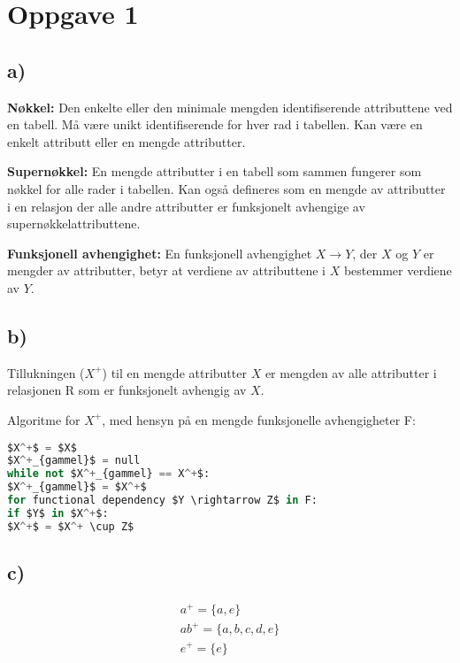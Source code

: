 \documentclass[a4paper, 12pt] {article}
\begin{document}

\newpage

\tableofcontents
\newpage


\section{Oppgave 1}

\subsection{a)}

\textbf{Nøkkel:} Den enkelte eller den minimale mengden identifiserende attributtene ved en tabell. Må være unikt identifiserende for hver rad i tabellen. Kan være en enkelt attributt eller en mengde attributter.


\textbf{Supernøkkel:} En mengde attributter i en tabell som sammen fungerer som nøkkel for alle rader i tabellen. Kan også defineres som en mengde av attributter i en relasjon der alle andre attributter er funksjonelt avhengige av supernøkkelattributtene.


\textbf{Funksjonell avhengighet:} En funksjonell avhengighet $X \rightarrow Y$, der $X$ og $Y$ er mengder av attributter, betyr at verdiene av attributtene i $X$ bestemmer verdiene av $Y$.

\subsection{b)}

Tillukningen ($X^+$) til en mengde attributter $X$ er mengden av alle attributter i relasjonen R som er funksjonelt avhengig av $X$.

Algoritme for $X^+$, med hensyn på en mengde funksjonelle avhengigheter F:

\begin{lstlisting}[language=Python, caption=Tillukningsalgoritme, mathescape]
$X^+$ = $X$
$X^+_{gammel}$ = null
while not $X^+_{gammel} == X^+$:
$X^+_{gammel}$ = $X^+$
for functional dependency $Y \rightarrow Z$ in F:
if $Y$ in $X^+$:
$X^+$ = $X^+ \cup Z$
\end{lstlisting}

\subsection{c)}

\begin{gather*}
    a^+ = \{a, e\} \\
    ab^+ = \{a, b, c, d, e\} \\
    e^+ = \{e\}
\end{gather*}
\end{document}
